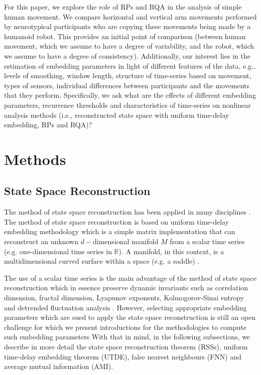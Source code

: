 \documentclass[fleqn,10pt]{wlscirep}
\begin{document}
For this paper, we explore the role of RPs and RQA in the 
analysis of simple human movement. 
We compare horizontal and 
vertical arm movements performed by neurotypical participants 
who are copying these movements being made by a humanoid robot.  
This provides an initial point of comparison 
(between human movement, which we assume to have a degree of variability, 
and the robot, which we assume to have a degree of consistency).   
Additionally, our interest lies in the estimation of embedding parameters 
in light of different features of the data, e.g., levels of smoothing, 
window length, structure of time-series based on movement, 
types of sensors, individual differences between participants and 
the movements that they perform. 
Specifically, we ask what are 
the effects of different embedding parameters, recurrence thresholds 
and characteristics of time-series on nonlinear analysis 
methods (i.e., reconstructed state space with 
uniform time-delay embedding, RPs and RQA)?



\section*{Methods}
\subsection*{State Space Reconstruction}
The method of state space reconstruction \cite{packard1980} 
\cite{takens1981} has been applied in many disciplines 
\cite{aguirre2009, stergiou2011, frank2010, 
sama2013, Quintana-Duque2016}. The method of state space reconstruction is 
based on uniform time-delay embedding methodology which is a simple 
matrix implementation that can reconstruct an unknown $d-$dimensional 
manifold $M$ from a scalar time series (e.g. one-dimensional 
time series in $\mathbb{R}$). A manifold, in this context, is a 
multidimensional curved surface within a space (e.g. a saddle) 
\cite{guastello-gregson2011}.

The use of a scalar time series is the main advantage of the method of state 
space reconstruction which in essence preserve dynamic invariants such as 
correlation dimension, fractal dimension, Lyapunov exponents, Kolmogorov-Sinai 
entropy and detrended fluctuation analysis \cite{bradley2015, 
Quintana-Duque2012, Quintana-Duque2013, Quintana-Duque2016, krakovska2015}.
However, selecting appropriate embedding parameters which are sued to apply the 
state space reconstruction is still an open challenge for which we present 
introductions for the methodologies to compute such embedding parameters 
With that in mind, in the following subsections, we describe in more detail 
the state space reconstruction theorem (RSSs), uniform time-delay embedding 
theorem (UTDE), false nearest neighbours (FNN) and average mutual 
information (AMI). 
\end{document}
